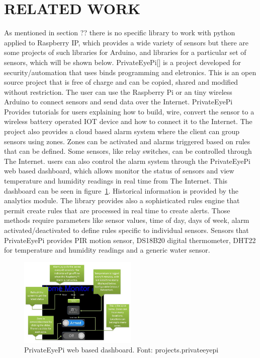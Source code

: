 \documentclass{acm_proc_article-sp}
\begin{document}
\section{RELATED WORK}
As mentioned in section ?? there is no specific library to work with python applied to Raspberry IP, which provides a wide variety of sensors but there are some projects of such libraries for Arduino, and libraries for a particular set of sensors, which will be shown below.
\newline
\newline
PrivateEyePi[] is a project developed for security/automation that uses binds programming and eletronics.%
This is an open source project that is free of charge and can be copied, shared and modified without restriction.
The user can use the Raspberry Pi or an tiny wireless Arduino to connect sensors and send data over the Internet.
\newline
\newline
PrivateEyePi Provides tutorials for users explaining how to build, wire, convert the sensor to a wireless battery operated IOT device and how to connect it to the Internet. The project also provides a cloud based alarm system where the client can group sensors using zones. Zones can be activated and alarms triggered based on rules that can be defined.
\newline
\newline
Some sensors, like relay switches, can be controlled through The Internet. users can also control the alarm system through the PrivateEyePi web based dashboard, which allows monitor the status of sensors and view temperature and humidity readings in real time from The Internet. This dashboard can be seen in figure~\ref{fig:PrivateEye}.
\newline
\newline
 Historical information is provided by the analytics module. The library provides also a sophisticated rules engine that permit create rules that are processed in real time to create alerts. Those methods require parameters like sensor values, time of day, days of week, alarm activated/deactivated to define rules specific to individual sensors.     
Sensors that PrivateEyePi provides PIR motion sensor, DS18B20 digital thermometer, DHT22 for temperature and humidity readings and a generic water sensor.
\begin{figure}[h]
    \includegraphics[width=0.5\textwidth,natwidth=610,natheight=642]{pictures/dashboardPrivateeye.png}
    \caption{PrivateEyePi web based dashboard. Font: projects.privateeyepi}
    \label{fig:PrivateEye}
\end{figure}
\end{document}

